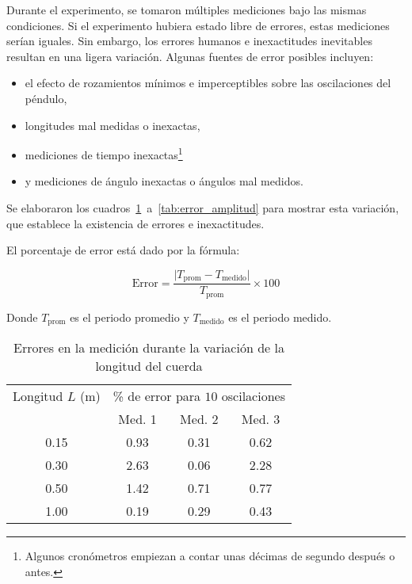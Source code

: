 \documentclass[twocolumn]{report}
\numberwithin{table}{section}
\begin{document}
Durante el experimento, se tomaron múltiples mediciones bajo las mismas
condiciones. Si el experimento hubiera estado libre de errores, estas
mediciones serían iguales. Sin embargo, los errores humanos e inexactitudes
inevitables resultan en una ligera variación. Algunas fuentes de
error posibles incluyen:

\begin{itemize}
  \item el efecto de rozamientos mínimos e imperceptibles sobre las
    oscilaciones del péndulo,
  \item longitudes mal medidas o inexactas,
  \item mediciones de tiempo inexactas\footnote{Algunos cronómetros
    empiezan a contar unas décimas de segundo después o antes.}
  \item y mediciones de ángulo inexactas o ángulos mal medidos.
\end{itemize}

Se elaboraron los cuadros~\ref{tab:error_longitud}~a~\ref{tab:error_amplitud}
para mostrar esta variación, que establece la existencia de errores e
inexactitudes.

El porcentaje de error está dado por la fórmula:

\begin{equation}
  \text{Error} = \frac{\lvert T_{\text{prom}} -
  T_{\text{medido}} \rvert}{T_{\text{prom}}} \times 100
\end{equation}

Donde $T_{\text{prom}}$ es el periodo promedio y $T_{\text{medido}}$ es
el periodo medido.

\begin{table}[ht]
  \centering
  \begin{tabular}{cccc}
    \toprule
    Longitud $L$ (m) & \multicolumn{3}{c}{\% de error para $10$
    oscilaciones} \\
    \cmidrule(lr){2-4}
    & Med. 1 & Med. 2 & Med. 3  \\
    \midrule
    0.15 & 0.93 & 0.31 & 0.62 \\
    0.30 & 2.63 & 0.06 & 2.28 \\
    0.50 & 1.42 & 0.71 & 0.77 \\
    1.00 & 0.19 & 0.29 & 0.43 \\
    \bottomrule
  \end{tabular}
  \caption{Errores en la medición durante la variación de la
  longitud del cuerda}\label{tab:error_longitud}
\end{table}
\end{document}
